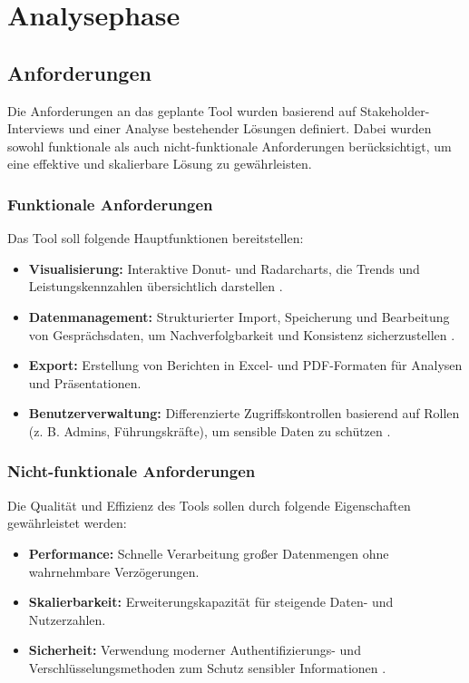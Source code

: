 \chapter{Analysephase}
\label{chap:analysephase}

\section{Anforderungen}
Die Anforderungen an das geplante Tool wurden basierend auf Stakeholder-Interviews und einer Analyse bestehender Lösungen definiert. Dabei wurden sowohl funktionale als auch nicht-funktionale Anforderungen berücksichtigt, um eine effektive und skalierbare Lösung zu gewährleisten.

\subsection{Funktionale Anforderungen}
Das Tool soll folgende Hauptfunktionen bereitstellen:
\begin{itemize}
    \item \textbf{Visualisierung:} Interaktive Donut- und Radarcharts, die Trends und Leistungskennzahlen übersichtlich darstellen \cite{kirk2016data}.
    \item \textbf{Datenmanagement:} Strukturierter Import, Speicherung und Bearbeitung von Gesprächsdaten, um Nachverfolgbarkeit und Konsistenz sicherzustellen \cite{bryson2011employee}.
    \item \textbf{Export:} Erstellung von Berichten in Excel- und PDF-Formaten für Analysen und Präsentationen.
    \item \textbf{Benutzerverwaltung:} Differenzierte Zugriffskontrollen basierend auf Rollen (z. B. Admins, Führungskräfte), um sensible Daten zu schützen \cite{duarte2012performance}.
\end{itemize}

\subsection{Nicht-funktionale Anforderungen}
Die Qualität und Effizienz des Tools sollen durch folgende Eigenschaften gewährleistet werden:
\begin{itemize}
    \item \textbf{Performance:} Schnelle Verarbeitung großer Datenmengen ohne wahrnehmbare Verzögerungen.
    \item \textbf{Skalierbarkeit:} Erweiterungskapazität für steigende Daten- und Nutzerzahlen.
    \item \textbf{Sicherheit:} Verwendung moderner Authentifizierungs- und Verschlüsselungsmethoden zum Schutz sensibler Informationen \cite{schober2008}.
\end{itemize}

